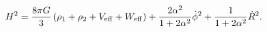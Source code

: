 \begin{equation}\label{Friedmann}
H^2 = \frac{8 \pi G}{3} \left(\rho_1 + \rho_2 + V_{\rm eff} 
+ W_{\rm eff} \right) + \frac{2\alpha^2}{1 + 2\alpha^2} \dot\phi^2
+ \frac{1}{1+2\alpha^2} \dot R^2.
\end{equation}

